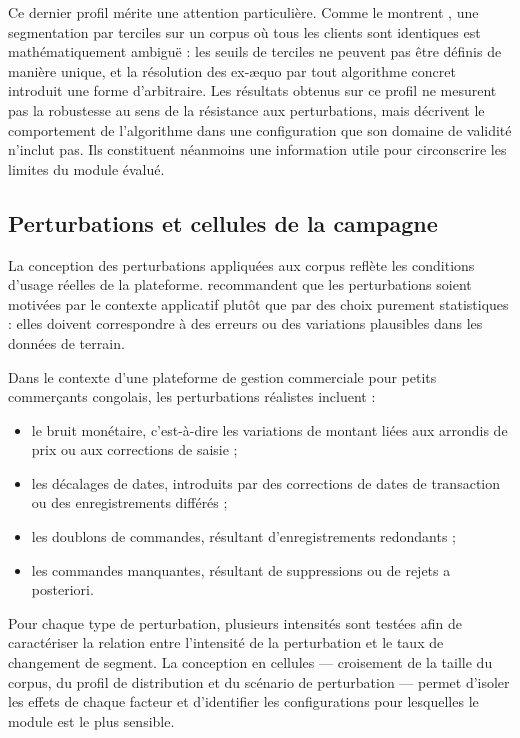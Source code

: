Ce dernier profil mérite une attention particulière. Comme le montrent \citet{ViannaFilho2026},
une segmentation par terciles sur un corpus où tous les clients sont identiques est
mathématiquement ambiguë : les seuils de terciles ne peuvent pas être définis de manière
unique, et la résolution des ex-æquo par tout algorithme concret introduit une forme
d'arbitraire. Les résultats obtenus sur ce profil ne mesurent pas la robustesse au sens
de la résistance aux perturbations, mais décrivent le comportement de l'algorithme dans une
configuration que son domaine de validité n'inclut pas. Ils constituent néanmoins une
information utile pour circonscrire les limites du module évalué.

\subsection{Perturbations et cellules de la campagne}
\label{subsec:revue-simulation-perturbations}

La conception des perturbations appliquées aux corpus reflète les conditions d'usage
réelles de la plateforme. \citet{Morris2019} recommandent que les perturbations soient
motivées par le contexte applicatif plutôt que par des choix purement statistiques : elles
doivent correspondre à des erreurs ou des variations plausibles dans les données de terrain.

Dans le contexte d'une plateforme de gestion commerciale pour petits commerçants congolais,
les perturbations réalistes incluent :

\begin{itemize}
  \item le bruit monétaire, c'est-à-dire les variations de montant liées aux arrondis de
    prix ou aux corrections de saisie ;
  \item les décalages de dates, introduits par des corrections de dates de transaction ou
    des enregistrements différés ;
  \item les doublons de commandes, résultant d'enregistrements redondants ;
  \item les commandes manquantes, résultant de suppressions ou de rejets a posteriori.
\end{itemize}

Pour chaque type de perturbation, plusieurs intensités sont testées afin de caractériser la
relation entre l'intensité de la perturbation et le taux de changement de segment. La
conception en cellules — croisement de la taille du corpus, du profil de distribution et
du scénario de perturbation — permet d'isoler les effets de chaque facteur et d'identifier
les configurations pour lesquelles le module est le plus sensible.

